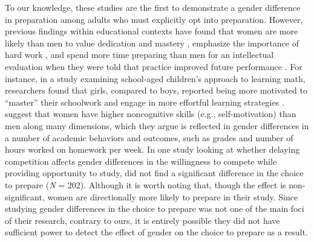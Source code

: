 \documentclass[letterpaper, nobind]{templates/ociamthesis}
\begin{document}
To our knowledge, these studies are the first to demonstrate a gender difference in preparation among adults who must explicitly opt into preparation. However, previous findings within educational contexts have found that women are more likely than men to value dedication and mastery \autocite{Leslie2015,Kenney-Benson2006}, emphasize the importance of hard work \autocite{Mccrea2008,Hirt2009,Mccrea2008a}, and spend more time preparing than men for an intellectual evaluation when they were told that practice improved future performance \autocite{Kimble2005}. For instance, in a study examining school-aged children's approach to learning math, researchers found that girls, compared to boys, reported being more motivated to ``master'' their schoolwork and engage in more effortful learning strategies \autocite{Kenney-Benson2006}. \textcite{Becker2010} suggest that women have higher noncognitive skills (e.g., self-motivation) than men along many dimensions, which they argue is reflected in gender differences in a number of academic behaviors and outcomes, such as grades and number of hours worked on homework per week. In one study looking at whether delaying competition affects gender differences in the willingness to compete while providing opportunity to study, \textcite{Charness2021} did not find a significant difference in the choice to prepare (\emph{N} = 202). Although it is worth noting that, though the effect is non-significant, women are directionally more likely to prepare in their study. Since studying gender differences in the choice to prepare was not one of the main foci of their research, contrary to ours, it is entirely possible they did not have sufficient power to detect the effect of gender on the choice to prepare as a result.
\end{document}

